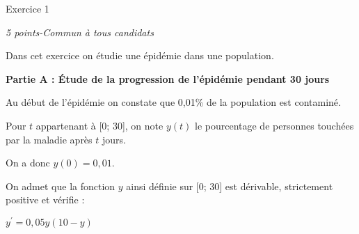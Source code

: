 
%
\begin{h2}Exercice 1\end{h2}
\textit{5 points-Commun à tous candidats }
\par
Dans cet exercice on étudie une épidémie dans une population.
\par
\textbf{Partie A : Étude de la progression de l'épidémie pendant 30 jours}
\par
Au début de l'épidémie on constate que 0,01\% de la population est contaminé.
\par
Pour $t$ appartenant à [0; 30], on note $y\left(t\right)$ le pourcentage de personnes touchées par la maladie après $t$ jours.
\par
On a donc $y\left(0\right)= 0,01$.
\par
On admet que la fonction $y$ ainsi définie sur [0; 30] est dérivable, strictement positive et vérifie :

\begin{center}
$y^{\prime}=0,05y\left(10-y\right)$
\end{center}

